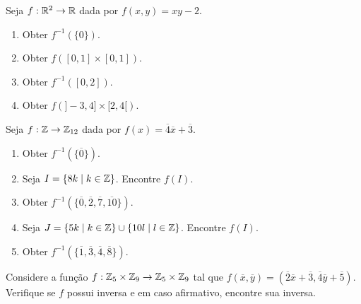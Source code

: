 \documentclass[12pt]{exam}
\begin{document}
    \vspace{.3cm}

    \questao{} Seja $f: \mathbb{R}^2 \to \mathbb{R}$ dada por $f(x,y) = xy - 2$.
    \begin{multicols}{2}
        \begin{enumerate}[label={\alph*})]
            \item Obter $f^{-1}(\{0\})$.

            \item Obter $f([0,1]\times [0,1])$.

            \item Obter $f^{-1}([0,2])$.

            \item Obter $f(]-3,4]\times [2,4[)$.
        \end{enumerate}
    \end{multicols}

    \vspace{.3cm}

    \questao{} Seja $f : \mathbb{Z} \to \mathbb{Z}_{12}$ dada por $f(x) = \overline{4}\overline{x} + \overline{3}$.
    \begin{enumerate}[label={\alph*})]
        \item Obter $f^{-1}(\{\overline{0}\})$.

        \item Seja $I = \{8k \mid k \in \mathbb{Z}\}$. Encontre $f(I)$.

        \item Obter $f^{-1}(\{\overline{0}, \overline{2}, \overline{7}, \overline{10}\})$.

        \item Seja $J = \{5k \mid k \in \mathbb{Z}\} \cup \{10l \mid l \in \mathbb{Z}\}$. Encontre $f(I)$.

        \item Obter $f^{-1}(\{\overline{1}, \overline{3}, \overline{4}, \overline{8}\})$.
    \end{enumerate}

    \vspace{.3cm}

    \questao{} Considere a fun{\c c}{\~a}o $f : \mathbb{Z}_5 \times \mathbb{Z}_9 \to \mathbb{Z}_5 \times \mathbb{Z}_9$ tal que $f(\overline{x},\overline{y}) = (\overline{2} \overline{x} + \overline{3}, \overline{4}\overline{y} + \overline{5})$. Verifique se $f$ possui inversa e em caso afirmativo, encontre sua inversa.

    \vspace{.3cm}
\end{document}
